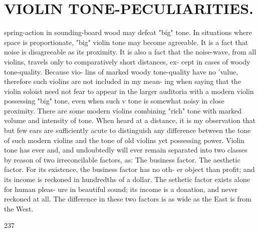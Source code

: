 \documentclass{article}
\begin{document}
\section*{VIOLIN TONE-PECULIARITIES.}
spring-action in sounding-board wood may defeat "big" tone. In situations where space is proportionate, "big" violin tone may become agreeable. It is a fact that noise is disagreeable as its proximity. It is also a fact that the noise-wave, from all violins, travels only to comparatively short distances, ex- cept in cases of woody tone-quality. Because vio- lins of marked woody tone-quality have no 'value, therefore such violins are not included in my mean- ing when saying that the violin soloist need not fear to appear in the larger auditoria with a modern violin possessing "big" tone, even when such v tone is somewhat noisy in close proximity. There are some modern violins combining "rich" tone with marked volume and intensity of tone. When heard at a distance, it is my observation that but few ears are sufficiently acute to distinguish any difference between the tone of such modern violins and the tone of old violins yet possessing power. Violin tone has ever and, and undoubtedly will ever remain separated into two classes by reason of two irreconcilable factors, as: The business factor. The aesthetic factor. For its existence, the business factor has no oth- er object than profit; and its income is reckoned in hundredths of a dollar. The sethetic factor exists alone for human pleas- ure in beautiful sound; its income is a donation, and never reckoned at all. The difference in these two factors is as wide as the East is from the West.

237
\end{document}
